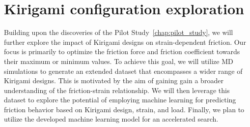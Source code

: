 \chapter{Kirigami configuration exploration}\label{chap:dataset_study}
Building upon the discoveries of the Pilot Study~\cref{chap:pilot_study}, we will further explore the impact of Kirigami designs on strain-dependent friction. Our focus is primarily to optimize the friction force and friction coefficient towards their maximum or minimum values. To achieve this goal, we will utilize \acrshort{MD} simulations to generate an extended dataset that encompasses a wider range of Kirigami designs. This is motivated by the aim of gaining gain a broader understanding of the friction-strain relationship. We will then leverage this dataset to explore the potential of employing machine learning for predicting friction behavior based on Kirigami design, strain, and load. Finally, we plan to utilize the developed machine learning model for an accelerated search. 


